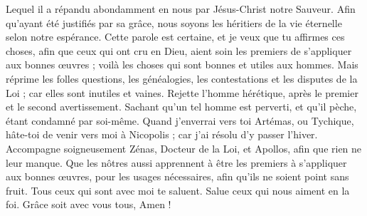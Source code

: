 \begin{multicols}{2}
Lequel il a répandu abondamment en nous par Jésus-Christ notre Sauveur.
Afin qu'ayant été justifiés par sa grâce, nous soyons les héritiers de la vie éternelle selon notre espérance.
Cette parole est certaine, et je veux que tu affirmes ces choses, afin que ceux qui ont cru en Dieu, aient soin les premiers de s'appliquer aux bonnes œuvres ; voilà les choses qui sont bonnes et utiles aux hommes.
Mais réprime les folles questions, les généalogies, les contestations et les disputes de la Loi ; car elles sont inutiles et vaines.
Rejette l'homme hérétique, après le premier et le second avertissement.
Sachant qu'un tel homme est perverti, et qu'il pèche, étant condamné par soi-même.
Quand j'enverrai vers toi Artémas, ou Tychique, hâte-toi de venir vers moi à Nicopolis ; car j'ai résolu d'y passer l'hiver.
Accompagne soigneusement Zénas, Docteur de la Loi, et Apollos, afin que rien ne leur manque.
Que les nôtres aussi apprennent à être les premiers à s'appliquer aux bonnes œuvres, pour les usages nécessaires, afin qu'ils ne soient point sans fruit.
Tous ceux qui sont avec moi te saluent. Salue ceux qui nous aiment en la foi. Grâce soit avec vous tous, Amen !
\PPE{}
\end{multicols}
